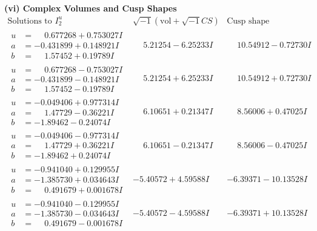 \documentclass[1p]{elsarticle_modified}
\theoremstyle{definition}
\newcommand{\I}{\sqrt{-1}}
\begin{document}
\newpage\flushleft \textbf{(vi) Complex Volumes and Cusp Shapes}
$$\begin{array}{c|c|c}  
\text{Solutions to }I^u_{2}& \I (\text{vol} + \sqrt{-1}CS) & \text{Cusp shape}\\
 \hline 
\begin{aligned}
u &= \phantom{-}0.677268 + 0.753027 I \\
a &= -0.431899 + 0.148921 I \\
b &= \phantom{-}1.57452 + 0.19789 I\end{aligned}
 & \phantom{-}5.21254 - 6.25233 I & \phantom{-}10.54912 - 0.72730 I \\ \hline\begin{aligned}
u &= \phantom{-}0.677268 - 0.753027 I \\
a &= -0.431899 - 0.148921 I \\
b &= \phantom{-}1.57452 - 0.19789 I\end{aligned}
 & \phantom{-}5.21254 + 6.25233 I & \phantom{-}10.54912 + 0.72730 I \\ \hline\begin{aligned}
u &= -0.049406 + 0.977314 I \\
a &= \phantom{-}1.47729 - 0.36221 I \\
b &= -1.89462 - 0.24074 I\end{aligned}
 & \phantom{-}6.10651 + 0.21347 I & \phantom{-}8.56006 + 0.47025 I \\ \hline\begin{aligned}
u &= -0.049406 - 0.977314 I \\
a &= \phantom{-}1.47729 + 0.36221 I \\
b &= -1.89462 + 0.24074 I\end{aligned}
 & \phantom{-}6.10651 - 0.21347 I & \phantom{-}8.56006 - 0.47025 I \\ \hline\begin{aligned}
u &= -0.941040 + 0.129955 I \\
a &= -1.385730 + 0.034643 I \\
b &= \phantom{-}0.491679 + 0.001678 I\end{aligned}
 & -5.40572 + 4.59588 I & -6.39371 - 10.13528 I \\ \hline\begin{aligned}
u &= -0.941040 - 0.129955 I \\
a &= -1.385730 - 0.034643 I \\
b &= \phantom{-}0.491679 - 0.001678 I\end{aligned}
 & -5.40572 - 4.59588 I & -6.39371 + 10.13528 I \\ \hline\begin{aligned}

\end{aligned}
\end{array}$$
\end{document}
